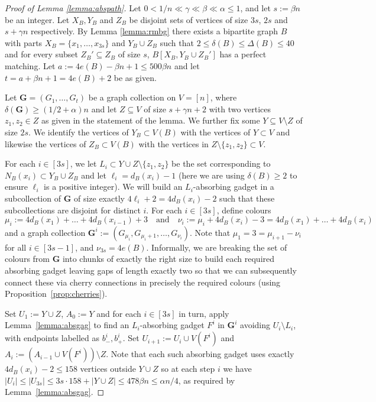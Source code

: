 \documentclass[11pt, dvipsnames]{amsart}
\theoremstyle{plain}
\theoremstyle{definition}
\newcommand{\mbf}[1]{\mathbf{#1}}
\newcommand{\sm}{\setminus}
\newcommand{\aA}{\alpha}
\newcommand{\bB}{\beta}
\newcommand{\gG}{\gamma}
\newcommand{\dD}{\delta}
\begin{document}
\begin{proof}[Proof of Lemma \ref{lemma:abspath}]
Let $0<1/n \ll \gG \ll \bB \ll \aA \leq 1$, and let $s:=\beta n$ be an integer. 
Let $X_B,Y_B$ and $ Z_B$ be disjoint sets of vertices of size $3s$, $2s$ and $s + \gG  n$ respectively. 
By Lemma \ref{lemma:rmbg} there exists a bipartite graph $B$ with parts $X_B=\{x_1, \ldots, x_{3s}\}$ and $Y_B \cup  Z_B$ such that $2 \leq \dD(B) \leq \Delta(B) \leq 40$ and for every subset $Z_B' \subseteq  Z_B$ of size $s$, $B[X_B, Y_B \cup Z_B']$ has a perfect matching. 
Let $a := 4e(B)-\bB n + 1 \leq 500 \bB n$ and let $t = a+\beta n+1= 4e(B)+2$ be as given.

Let $\mbf G = (G_1,\ldots,G_t)$ be a graph collection on $V=[n]$, where $\dD(\mbf {G}) \geq (1/2+\aA)n$ and let $Z \subseteq V$ of size $s+\gG n+2$ with two vertices $z_1,z_2\in Z$ as given in the statement of the lemma.  We further fix some  $Y \subseteq V \sm Z$ of size $2s$.
We identify the  vertices of $Y_B\subset V(B)$ with the vertices of $Y\subset V$ and likewise the vertices of $Z_B\subset V(B)$ with the vertices in $Z\sm \{z_1,z_2\}\subset V$.

For each $i \in [3s]$, we let $L_i\subset Y\cup Z\setminus \{z_1,z_2\}$ be the set corresponding to $N_B(x_i)\subset Y_B\cup Z_B$ and let $\ell_i=d_B(x_i)-1$ (here we are using $\delta(B)\ge 2$ to ensure $\ell_i$ is a positive integer).  We will build an $L_i$-absorbing gadget in a subcollection of $\mbf{G}$ of size exactly $4\ell_i+2=4d_B(x_i)-2$ such that these subcollections are disjoint for distinct $i$. 
For each $i \in [3s]$, define colours
\begin{equation*}
\mu_i := 4d_B(x_1)+\ldots+4d_B(x_{i-1})+3 
\quad\text{and}\quad
\nu_i := \mu_i + 4d_B(x_i)-3 = 4d_B(x_1)+\ldots + 4d_B(x_i)
 \end{equation*} 
and a graph collection $\mbf G^i := (G_{\mu_i},G_{\mu_i+1},\ldots,G_{\nu_i})$.
Note that $\mu_1=3=\mu_{i+1}-\nu_i$ for all $i \in [3s-1]$, and $\nu_{3s}=4e(B)$.
Informally, we are breaking the set of colours from $\mbf G$ into chunks of exactly the right size to build each required absorbing gadget leaving gaps of length exactly two so that we can subsequently connect these via cherry connections in precisely the required colours (using Proposition~\ref{prop:cherries}).

Set $U_1:=Y\cup Z$, $A_0:=Y$ and for each $i\in [3s]$ in turn, apply Lemma~\ref{lemma:absgag} to find an $L_i$-absorbing gadget $F^i$ in $\mbf G^i$ avoiding $U_i\setminus L_i$,  with endpoints labelled as $b^i_-,b^i_{+}$.
Set $U_{i+1}:=U_i\cup V(F^i)$ and $A_i:=(A_{i-1}\cup V(F^i))\sm Z$. 
Note that each such absorbing gadget uses exactly $4 d_B(x_i)-2\le 158$ vertices outside $Y \cup Z$ so at each step $i$ we have $|U_i|\le |U_{3s}|\le  3s\cdot 158+|Y\cup Z|\le 478\beta n \leq \alpha n/4$, as required by Lemma~\ref{lemma:absgag}.



\end{proof}
\end{document}
